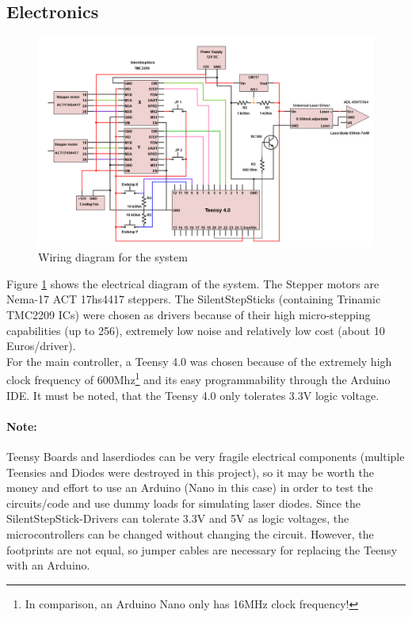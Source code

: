 \documentclass[a4paper, 11pt]{scrartcl}
\begin{document}
\subsection{Electronics}
\begin{figure}[H]
\begin{center}
\includegraphics[width=15cm]{img/electronics.png}
\caption{Wiring diagram for the system}
\label{electronics}
\end{center}
\end{figure}
Figure \ref{electronics} shows the electrical diagram of the system. The Stepper motors are Nema-17 ACT 17hs4417 steppers. The SilentStepSticks (containing Trinamic TMC2209 ICs)  were chosen as drivers because of their high micro-stepping capabilities (up to 256), extremely low noise and relatively low cost (about 10 Euros/driver). \\
For the main controller, a Teensy 4.0 was chosen because of the extremely high clock frequency of 600Mhz\footnote{In comparison, an Arduino Nano only has 16MHz clock frequency!} and its easy programmability through the Arduino IDE. It must be noted, that the Teensy 4.0 only tolerates 3.3V logic voltage. 

\paragraph{Note:} Teensy Boards and laserdiodes can be very fragile electrical components (multiple Teensies and Diodes were destroyed in this project), so it may be worth the money and effort to use an Arduino (Nano in this case) in order to test the circuits/code and use dummy loads for simulating laser diodes. Since the SilentStepStick-Drivers can tolerate 3.3V and 5V as logic voltages, the microcontrollers can be changed without changing the circuit. However, the footprints are not equal, so jumper cables are necessary for replacing the Teensy with an Arduino. \\
\end{document}
